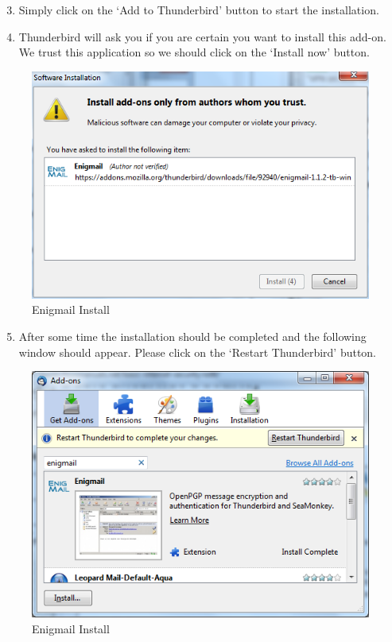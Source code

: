 \begin{enumerate}[1.]
\setcounter{enumi}{2}
\item
  Simply click on the `Add to Thunderbird' button to start the
  installation.
\item
  Thunderbird will ask you if you are certain you want to install this
  add-on. We trust this application so we should click on the `Install
  now' button.
\end{enumerate}
\begin{figure}[htbp]
\centering
\includegraphics{enigmail_inst_2.png}
\caption{Enigmail Install}
\end{figure}

\begin{enumerate}[1.]
\setcounter{enumi}{4}
\item
  After some time the installation should be completed and the following
  window should appear. Please click on the `Restart Thunderbird'
  button.
\end{enumerate}
\begin{figure}[htbp]
\centering
\includegraphics{enigmail_inst_3.png}
\caption{Enigmail Install}
\end{figure}

